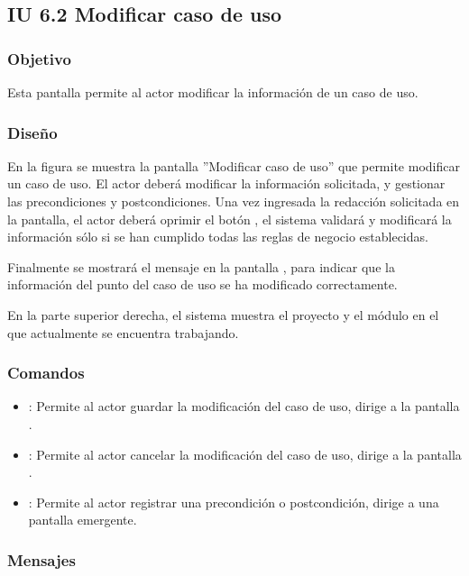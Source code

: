 \subsection{IU 6.2 Modificar caso de uso}

\subsubsection{Objetivo}
	Esta pantalla permite al actor modificar la información de un caso de uso.
\subsubsection{Diseño}
	En la figura  se muestra la pantalla ''Modificar caso de uso'' que permite modificar un caso de uso. El actor deberá modificar la información solicitada, y gestionar las precondiciones y postcondiciones.
	Una vez ingresada la redacción solicitada en la pantalla, el actor deberá oprimir el botón , el sistema validará y modificará la información sólo si se han cumplido todas las reglas de negocio establecidas.
	
	Finalmente se mostrará el mensaje  en la pantalla , para indicar que la información del punto del caso de uso se ha modificado correctamente.
	
	En la parte superior derecha, el sistema muestra el proyecto y el módulo en el que actualmente se encuentra trabajando.

\subsubsection{Comandos}
\begin{itemize}
	\item {}: Permite al actor guardar la modificación del caso de uso, dirige a la pantalla .
	\item {}: Permite al actor cancelar la modificación del caso de uso, dirige a la pantalla .
	\item {}: Permite al actor registrar una precondición o postcondición, dirige a una pantalla emergente.
\end{itemize}

\subsubsection{Mensajes}

